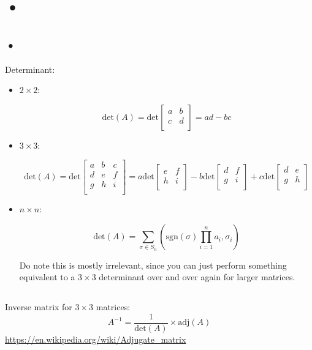 \documentclass{report}
\newcommand{\rm}{\textrm}
\newcommand{\det}{\textrm{det}}
\begin{document}
\section{•}

\subsection{•}
Determinant:
\begin{itemize}
\item$2\times2$:

$$\det(A)=\det\begin{bmatrix}a&b\\c&d\\\end{bmatrix}=ad-bc$$
\item$3\times3$:

$$\det(A)=\det\begin{bmatrix}a&b&c\\d&e&f\\g&h&i\\\end{bmatrix}=a\det\begin{bmatrix}e&f\\h&i\\\end{bmatrix}-b\det\begin{bmatrix}d&f\\g&i\\\end{bmatrix}+c\det\begin{bmatrix}d&e\\g&h\\\end{bmatrix}$$

\item$n\times n$:

$$\det(A)=\sum_{\sigma\in S_n}(\rm{sgn}(\sigma)\prod_{i=1}^{n}a_i,\sigma_i )$$

Do note this is mostly irrelevant, since you can just perform something equivalent to a $3\times3$ determinant over and over again for larger matrices.
\end{itemize}

\subsection{}
Inverse matrix for $3\times3$ matrices:
$$A^{-1}=\frac{1}{\det(A)}\times \rm{adj}(A)$$
\url{https://en.wikipedia.org/wiki/Adjugate_matrix}
\end{document}
